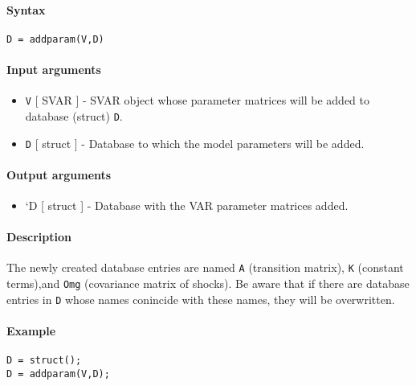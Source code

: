 


	\paragraph{Syntax}\label{syntax}

\begin{verbatim}
D = addparam(V,D)
\end{verbatim}

\paragraph{Input arguments}\label{input-arguments}

\begin{itemize}
\item
  \texttt{V} {[} SVAR {]} - SVAR object whose parameter matrices will be
  added to database (struct) \texttt{D}.
\item
  \texttt{D} {[} struct {]} - Database to which the model parameters
  will be added.
\end{itemize}

\paragraph{Output arguments}\label{output-arguments}

\begin{itemize}
\itemsep1pt\parskip0pt
\item
  `D {[} struct {]} - Database with the VAR parameter matrices added.
\end{itemize}

\paragraph{Description}\label{description}

The newly created database entries are named \texttt{A} (transition
matrix), \texttt{K} (constant terms),and \texttt{Omg} (covariance matrix
of shocks). Be aware that if there are database entries in \texttt{D}
whose names conincide with these names, they will be overwritten.

\paragraph{Example}\label{example}

\begin{verbatim}
D = struct();
D = addparam(V,D);
\end{verbatim}


